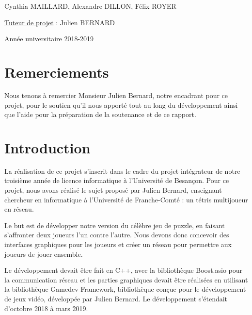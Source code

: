 \documentclass[a4paper, 12pt]{article}
\begin{document}
\begin{titlepage}
\begin{sffamily}
\begin{center}
    \vspace{1cm}

    \Large{Cynthia MAILLARD, Alexandre DILLON, Félix ROYER} \\

    \vspace{0.25cm}

    \Large{\underline{Tuteur de projet} : Julien BERNARD}
    
    \vspace{0.5cm}

    {\large Année universitaire 2018-2019}

    \end{center}
    \end{sffamily}
    \thispagestyle{empty}%


\end{titlepage}

\newpage

\tableofcontents

\newpage

\section*{Remerciements}

Nous tenons à remercier Monsieur Julien Bernard, notre encadrant pour ce projet, pour le soutien qu'il nous apporté tout au long du développement ainsi que l'aide pour la préparation de la soutenance et de ce rapport.

\newpage
	
\section*{Introduction}
	La réalisation de ce projet s'inscrit dans le cadre du projet intégrateur de notre troisième année de licence informatique à l'Université de Besançon. Pour ce projet, nous avons réalisé le sujet proposé par Julien Bernard, enseignant-chercheur en informatique à l'Université de Franche-Comté : un tétris multijoueur en réseau.

	\bigskip

	Le but est de développer notre version du célèbre jeu de puzzle, en faisant s'affronter deux joueurs l'un contre l'autre. Nous devons donc concevoir des interfaces graphiques pour les joueurs et créer un réseau pour permettre aux joueurs de jouer ensemble.

	\bigskip

	Le développement devait être fait en C++, avec la bibliothèque Boost.asio pour la communication réseau et les parties graphiques devait être réalisées en utilisant la bibliothèque Gamedev Framework, bibliothèque conçue pour le développement de jeux vidéo, développée par Julien Bernard.
	Le développement s'étendait d'octobre 2018 à mars 2019.
\end{document}
